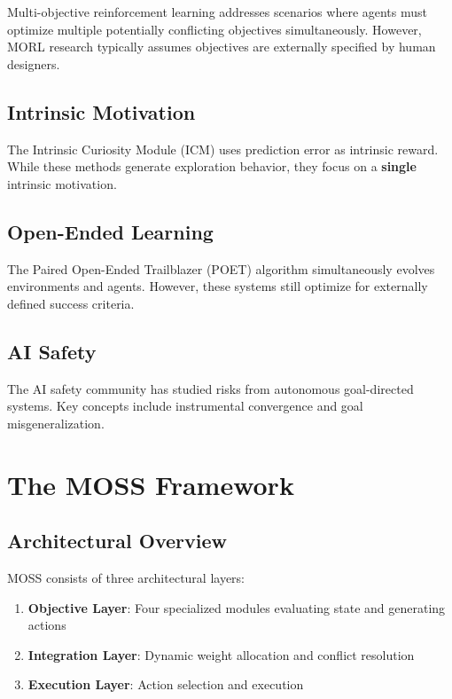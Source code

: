 \documentclass[10pt,a4paper]{article}
\begin{document}
Multi-objective reinforcement learning addresses scenarios where agents must optimize multiple potentially conflicting objectives simultaneously. However, MORL research typically assumes objectives are externally specified by human designers.

\subsection{Intrinsic Motivation}

The Intrinsic Curiosity Module (ICM) uses prediction error as intrinsic reward. While these methods generate exploration behavior, they focus on a \textbf{single} intrinsic motivation.

\subsection{Open-Ended Learning}

The Paired Open-Ended Trailblazer (POET) algorithm simultaneously evolves environments and agents. However, these systems still optimize for externally defined success criteria.

\subsection{AI Safety}

The AI safety community has studied risks from autonomous goal-directed systems. Key concepts include instrumental convergence and goal misgeneralization.

\section{The MOSS Framework}

\subsection{Architectural Overview}

MOSS consists of three architectural layers:

\begin{enumerate}
    \item \textbf{Objective Layer}: Four specialized modules evaluating state and generating actions
    \item \textbf{Integration Layer}: Dynamic weight allocation and conflict resolution
    \item \textbf{Execution Layer}: Action selection and execution
\end{enumerate}
\end{document}
